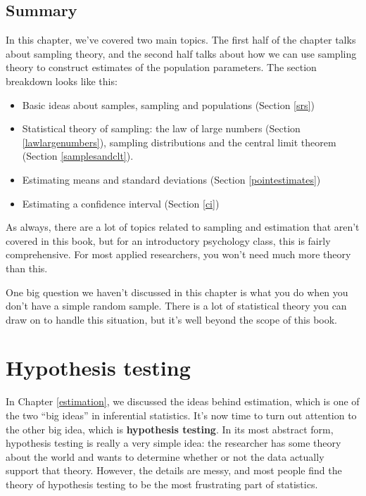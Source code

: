 \documentclass[
]{book}
\providecommand{\tightlist}{%
  \setlength{\itemsep}{0pt}\setlength{\parskip}{0pt}}
\theoremstyle{definition}
\theoremstyle{definition}
\theoremstyle{definition}
\theoremstyle{definition}
\theoremstyle{remark}
\begin{document}
\hypertarget{summary-3}{%
\section{Summary}\label{summary-3}}

In this chapter, we've covered two main topics. The first half of the chapter talks about sampling theory, and the second half talks about how we can use sampling theory to construct estimates of the population parameters. The section breakdown looks like this:

\begin{itemize}
\tightlist
\item
  Basic ideas about samples, sampling and populations (Section \ref{srs})
\item
  Statistical theory of sampling: the law of large numbers (Section \ref{lawlargenumbers}), sampling distributions and the central limit theorem (Section \ref{samplesandclt}).
\item
  Estimating means and standard deviations (Section \ref{pointestimates})
\item
  Estimating a confidence interval (Section \ref{ci})
\end{itemize}

As always, there are a lot of topics related to sampling and estimation that aren't covered in this book, but for an introductory psychology class, this is fairly comprehensive. For most applied researchers, you won't need much more theory than this.

One big question we haven't discussed in this chapter is what you do when you don't have a simple random sample. There is a lot of statistical theory you can draw on to handle this situation, but it's well beyond the scope of this book.

\hypertarget{hypothesistesting}{%
\chapter{Hypothesis testing}\label{hypothesistesting}}

In Chapter \ref{estimation}, we discussed the ideas behind estimation, which is one of the two ``big ideas'' in inferential statistics. It's now time to turn out attention to the other big idea, which is \textbf{hypothesis testing}. In its most abstract form, hypothesis testing is really a very simple idea: the researcher has some theory about the world and wants to determine whether or not the data actually support that theory. However, the details are messy, and most people find the theory of hypothesis testing to be the most frustrating part of statistics.
\end{document}
